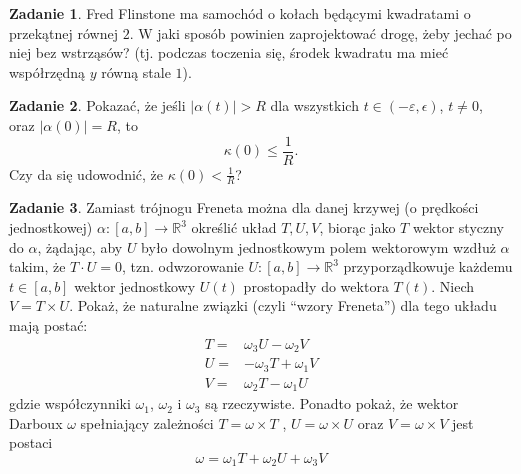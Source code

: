 \documentclass[a4paper,11pt]{article}
\theoremstyle{definition}\newtheorem{exercise}{Zadanie}
\theoremstyle{definition}\newtheorem{remark}{Uwaga}
\begin{document}
\begin{exercise}
Fred Flinstone ma samochód o kołach będącymi kwadratami o przekątnej równej $2$. W jaki sposób powinien zaprojektować drogę, żeby jechać po niej bez wstrząsów? (tj. podczas toczenia się, środek kwadratu ma mieć współrzędną $y$ równą stale $1$).
\end{exercise}

\begin{exercise}
Pokazać, że jeśli $|\alpha(t)|>R$ dla wszystkich $t\in (-\varepsilon, 
\epsilon)$, $t\neq 0$, oraz $|\alpha(0)|=R$, to 
\[\kappa(0)\leqslant \frac{1}{R}.\]
Czy da się udowodnić, że $\kappa(0)<\frac{1}{R}$?
\end{exercise}

\begin{exercise}
Zamiast trójnogu Freneta można dla danej krzywej (o prędkości jednostkowej) $\alpha\colon[a,b]\to \mathbb{R}^3$ określić układ ${T, U, V }$, biorąc jako $T$ wektor styczny do $\alpha$, żądając, aby $U$ było dowolnym jednostkowym polem wektorowym wzdłuż $\alpha$ takim, że $T\cdot U= 0$, tzn. odwzorowanie $U\colon[a, b] \to \mathbb{R}^3$ przyporządkowuje każdemu $t \in [a, b]$ wektor jednostkowy $U(t)$ prostopadły do wektora $T(t)$. Niech $V = T \times U$. Pokaż, że naturalne związki (czyli ``wzory Freneta'') dla tego układu mają postać:
\begin{align*}
T =& \omega_3 U - \omega_2V \\
U =& -\omega_3T + \omega_1 V\\
V =& \omega_2 T - \omega_1U
\end{align*}
gdzie współczynniki $\omega_1$, $\omega_2$ i $\omega_3$ są rzeczywiste. Ponadto pokaż, że wektor
Darboux $\omega$ spełniający zależności $T = \omega\times T$ , $U = \omega\times  U$ oraz $V = \omega\times  V$
jest postaci \[\omega = \omega_1T + \omega_2U + \omega_3 V \]
\end{exercise}
\end{document}
